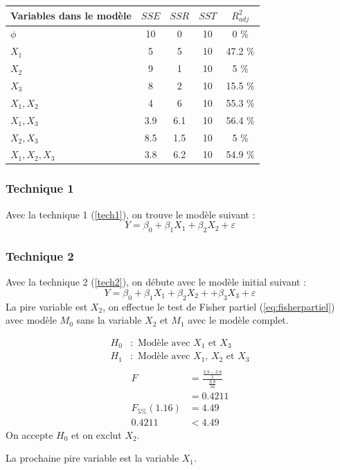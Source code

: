 \documentclass[11pt,french]{report}
\begin{document}
\begin{tabularx}{\linewidth}{|X|c|c|c|c|}
\hline
Variables dans le modèle & $SSE$ & $SSR$ & $SST$ & $R^2_{adj}$ \\
\hline
$\phi$ & 10 & 0 & 10 & 0 \% \\
$X_1$ & 5 & 5 & 10 & 47.2 \% \\
$X_2$ & 9 & 1 & 10 & 5 \% \\
$X_3$ & 8 & 2 & 10 & 15.5 \% \\
$X_1, X_2$ & 4 & 6 & 10 & 55.3 \% \\
$X_1, X_3$ & 3.9 & 6.1 & 10 & 56.4 \% \\
$X_2, X_3$ & 8.5 & 1.5 & 10 & 5 \% \\
$X_1, X_2, X_3$ & 3.8 & 6.2 & 10 & 54.9 \% \\
\hline
\end{tabularx}

\subsubsection*{Technique 1}
Avec la technique 1 (\ref{tech1}), on trouve le modèle suivant :
$$
Y = \beta_0 + \beta_1X_1 + \beta_2X_2 + \varepsilon
$$

\subsubsection*{Technique 2}
Avec la technique 2 (\ref{tech2}), on débute avec le modèle initial suivant :
$$
Y = \beta_0 + \beta_1X_1 + \beta_2X_2 + + \beta_3X_3 + \varepsilon
$$
La pire variable est $X_2$, on effectue le test de Fisher partiel (\ref{eq:fisherpartiel}) avec modèle $M_0$ sans la variable $X_2$ et $M_1$ avec le modèle complet. 

\begin{align*}
H_0 &: \text{ Modèle avec $X_1$ et $X_3$} \\
H_1 &: \text{ Modèle avec $X_1$, $X_2$ et $X_3$} \\
\end{align*}
\begin{align*}
F &= \frac{\frac{3.9-3.8}{1}}{\frac{3.8}{16}} \\
&= 0.4211 \\
F_{5 \%}(1.16) &= 4.49 \\
0.4211 &< 4.49
\end{align*}
On accepte $H_0$ et on exclut $X_2$. \newline

La prochaine pire variable est la variable $X_1$.
\end{document}
